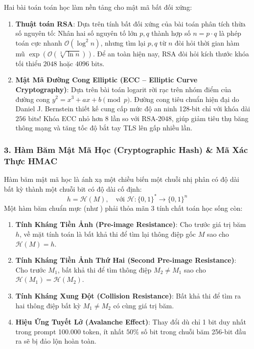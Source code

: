 Hai bài toán toán học làm nền tảng cho mật mã bất đối xứng:
\begin{enumerate}
  \item \textbf{Thuật toán RSA}: Dựa trên tính bất đối xứng của bài toán phân tích thừa số nguyên tố: Nhân hai số nguyên tố lớn $p, q$ thành hợp số $n = p \cdot q$ là phép toán cực nhanh $\mathcal{O}(\log^2 n)$, nhưng tìm lại $p, q$ từ $n$ đòi hỏi thời gian hàm mũ $\exp(\mathcal{O}(\sqrt[3]{\ln n}))$. Để an toàn hiện nay, RSA đòi hỏi kích thước khóa tối thiểu $2048$ hoặc $4096\text{ bits}$.
  \item \textbf{Mật Mã Đường Cong Elliptic (ECC -- Elliptic Curve Cryptography)}: Dựa trên bài toán logarit rời rạc trên nhóm điểm của đường cong $y^2 = x^3 + ax + b \pmod{p}$. Đường cong tiêu chuẩn hiện đại  do Daniel J. Bernstein thiết kế cung cấp mức độ an ninh 128-bit chỉ với khóa dài $256\text{ bits}$! Khóa ECC nhỏ hơn 8 lần so với RSA-2048, giúp giảm tiêu thụ băng thông mạng và tăng tốc độ bắt tay TLS lên gấp nhiều lần.
\end{enumerate}

\subsubsection{3. Hàm Băm Mật Mã Học (Cryptographic Hash) \& Mã Xác Thực HMAC}
Hàm băm mật mã học là ánh xạ một chiều biến một chuỗi nhị phân có độ dài bất kỳ thành một chuỗi bit có độ dài cố định:
\begin{equation}
h = \mathcal{H}(M), \quad \text{với } \mathcal{H}: \{0, 1\}^* \to \{0, 1\}^n
\end{equation}
Một hàm băm chuẩn mực (như ) phải thỏa mãn 3 tính chất toán học sống còn:
\begin{enumerate}
  \item \textbf{Tính Kháng Tiền Ảnh (Pre-image Resistance)}: Cho trước giá trị băm $h$, về mặt tính toán là bất khả thi để tìm lại thông điệp gốc $M$ sao cho $\mathcal{H}(M) = h$.
  \item \textbf{Tính Kháng Tiền Ảnh Thứ Hai (Second Pre-image Resistance)}: Cho trước $M_1$, bất khả thi để tìm thông điệp $M_2 \neq M_1$ sao cho $\mathcal{H}(M_1) = \mathcal{H}(M_2)$.
  \item \textbf{Tính Kháng Xung Đột (Collision Resistance)}: Bất khả thi để tìm ra hai thông điệp bất kỳ $M_1 \neq M_2$ có cùng giá trị băm.
  \item \textbf{Hiệu Ứng Tuyết Lở (Avalanche Effect)}: Thay đổi dù chỉ 1 bit duy nhất trong prompt 100.000 token, ít nhất $50\%$ số bit trong chuỗi băm 256-bit đầu ra sẽ bị đảo lộn hoàn toàn.
\end{enumerate}

